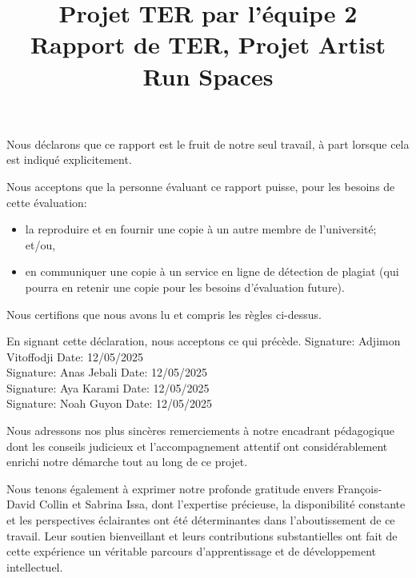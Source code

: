 \documentclass[mstat,12pt]{unswthesis}
\title{Projet TER par l'équipe 2\\[0.5cm]Rapport de TER, Projet Artist Run Spaces}
\author{\Authornameonly}
\begin{document}
\beforepreface



\vskip 2pc \noindent Nous déclarons que ce rapport est le fruit de notre seul travail, à part lorsque cela est indiqué  explicitement. 

\vskip 2pc  \noindent Nous acceptons que la personne évaluant ce rapport puisse, pour les besoins de cette évaluation:
\begin{itemize}
\item la reproduire et en fournir une copie à un autre membre de l'université; et/ou,
\item en communiquer une copie à un service en ligne de détection de plagiat (qui pourra en retenir une copie pour les besoins d'évaluation future).
\end{itemize}

\vskip 2pc \noindent Nous certifions que nous avons lu et compris les règles ci-dessus.\vspace{24pt}

\vskip 2pc \noindent En signant cette déclaration, nous acceptons ce qui précède.
\vskip 2pc \noindent
Signature: Adjimon Vitoffodji \hfill Date: 12/05/2025 \\[1cm]
Signature: Anas Jebali \hfill Date: 12/05/2025 \\[1cm]
Signature: Aya Karami \hfill Date: 12/05/2025 \\[1cm]
Signature: Noah Guyon \hfill Date: 12/05/2025 \\[1cm]
\vskip 1pc



\vspace{7 cm}
Nous adressons nos plus sincères remerciements à notre encadrant pédagogique dont les conseils judicieux et l'accompagnement attentif ont considérablement enrichi notre démarche tout au long de ce projet.

\vspace{0.5 cm} 

Nous tenons également à exprimer notre profonde gratitude envers François-David Collin et Sabrina Issa, dont l'expertise précieuse, la disponibilité constante et les perspectives éclairantes ont été déterminantes dans l'aboutissement de ce travail. Leur soutien bienveillant et leurs contributions substantielles ont fait de cette expérience un véritable parcours d'apprentissage et de développement intellectuel.
\end{document}
